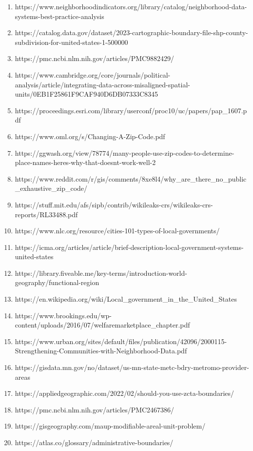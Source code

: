 \documentclass[
  letterpaper,
  DIV=11,
  numbers=noendperiod]{scrartcl}
\begin{document}
\begin{enumerate}
\item
  https://www.neighborhoodindicators.org/library/catalog/neighborhood-data-systems-best-practice-analysis
\item
  https://catalog.data.gov/dataset/2023-cartographic-boundary-file-shp-county-subdivision-for-united-states-1-500000
\item
  https://pmc.ncbi.nlm.nih.gov/articles/PMC9882429/
\item
  https://www.cambridge.org/core/journals/political-analysis/article/integrating-data-across-misaligned-spatial-units/0EB1F25861F9CAF940D6DB07333C8345
\item
  https://proceedings.esri.com/library/userconf/proc10/uc/papers/pap\_1607.pdf
\item
  https://www.oml.org/s/Changing-A-Zip-Code.pdf
\item
  https://ggwash.org/view/78774/many-people-use-zip-codes-to-determine-place-names-heres-why-that-doesnt-work-well-2
\item
  https://www.reddit.com/r/gis/comments/8xe8l4/why\_are\_there\_no\_public\_exhaustive\_zip\_code/
\item
  https://stuff.mit.edu/afs/sipb/contrib/wikileaks-crs/wikileaks-crs-reports/RL33488.pdf
\item
  https://www.nlc.org/resource/cities-101-types-of-local-governments/
\item
  https://icma.org/articles/article/brief-description-local-government-systems-united-states
\item
  https://library.fiveable.me/key-terms/introduction-world-geography/functional-region
\item
  https://en.wikipedia.org/wiki/Local\_government\_in\_the\_United\_States
\item
  https://www.brookings.edu/wp-content/uploads/2016/07/welfaremarketplace\_chapter.pdf
\item
  https://www.urban.org/sites/default/files/publication/42096/2000115-Strengthening-Communities-with-Neighborhood-Data.pdf
\item
  https://gisdata.mn.gov/no/dataset/us-mn-state-metc-bdry-metromo-provider-areas
\item
  https://appliedgeographic.com/2022/02/should-you-use-zcta-boundaries/
\item
  https://pmc.ncbi.nlm.nih.gov/articles/PMC2467386/
\item
  https://gisgeography.com/maup-modifiable-areal-unit-problem/
\item
  https://atlas.co/glossary/administrative-boundaries/

\end{enumerate}
\end{document}
